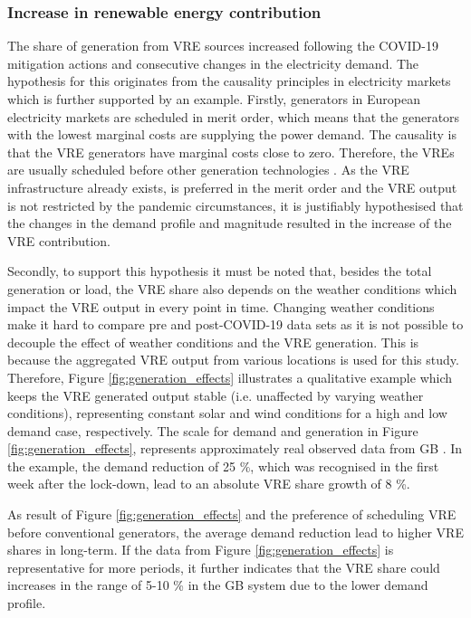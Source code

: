 \documentclass[energies,article,submit,moreauthors,pdftex]{Definitions/mdpi}
\begin{document}
\subsubsection{Increase in renewable energy contribution}
The share of generation from VRE sources increased following the COVID-19 mitigation actions and consecutive changes in the electricity demand. The hypothesis for this originates from the causality principles in electricity markets which is further supported by an example. 
Firstly, generators in European electricity markets are scheduled in merit order, which means that the generators with the lowest marginal costs are supplying the power demand. The causality is that the VRE generators have marginal costs close to zero. Therefore, the VREs are usually scheduled before other generation technologies \cite{Winkler2016ImpactMatter}. As the VRE infrastructure already exists, is preferred in the merit order and the VRE output is not restricted by the pandemic circumstances, it is justifiably hypothesised that the changes in the demand profile and magnitude resulted in the increase of the VRE contribution. 

Secondly, to support this hypothesis it must be noted that, besides the total generation or load, the VRE share also depends on the weather conditions which impact the VRE output in every point in time. Changing weather conditions make it hard to compare pre and post-COVID-19 data sets as it is not possible to decouple the effect of weather conditions and the VRE generation. This is because the aggregated VRE output from various locations is used for this study. Therefore, Figure \ref{fig:generation_effects} illustrates a qualitative example which keeps the VRE generated output stable (i.e. unaffected by varying weather conditions), representing constant solar and wind conditions for a high and low demand case, respectively. 
The scale for demand and generation in Figure \ref{fig:generation_effects}, represents approximately real observed data from GB \cite{ENTSO-E2020ENTSO-EPlatform}. In the example, the demand reduction of 25 \%, which was recognised in the first week after the lock-down, lead to an absolute VRE share growth of 8 \%.

As result of Figure \ref{fig:generation_effects} and the preference of scheduling VRE before conventional generators, the average demand reduction lead to higher VRE shares in long-term. If the data from Figure \ref{fig:generation_effects} is representative for more periods, it further indicates that the VRE share could increases in the range of 5-10 \% in the GB system due to the lower demand profile.
\end{document}
